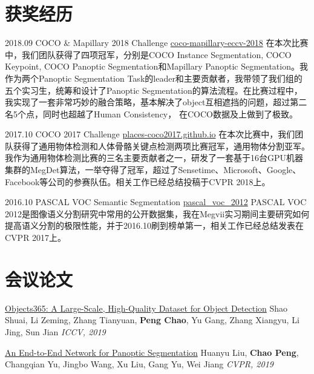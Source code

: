 \documentclass[]{friggeri-cv}
\begin{document}
\section{获奖经历}
  \begin{entrylist}
  \entry
    {2018.09}
    {COCO \& Mapillary 2018 Challenge}
    {\href{http://cocodataset.org/workshop/coco-mapillary-eccv-2018.html}{coco-mapillary-eccv-2018}}
    {在本次比赛中，我们团队获得了四项冠军，分别是COCO Instance Segmentation, COCO Keypoint, COCO Panoptic Segmentation和Mapillary Panoptic Segmentation。我作为两个Panoptic Segmentation Task的leader和主要贡献者，我带领了我们组的五个实习生，统筹和设计了Panoptic Segmentation的算法流程。在比赛过程中，我实现了一套非常巧妙的融合策略，基本解决了object互相遮挡的问题，超过第二名5个点，同时也超越了Human Consistency，
    在COCO数据及上做到了极致。}

  \entry
    {2017.10}
    {COCO 2017 Challenge}
    {\href{https://places-coco2017.github.io/}{places-coco2017.github.io}}
    {在本次比赛中，我们团队获得了通用物体检测和人体骨骼关键点检测两项比赛冠军，通用物体分割亚军。我作为通用物体检测比赛的三名主要贡献者之一，研发了一套基于16台GPU机器集群的MegDet算法，一举夺得了冠军，超过了Sensetime、Microsoft、Google、Facebook等公司的参赛队伍。相关工作已经总结投稿于CVPR 2018上。}

  \entry
    {2016.10}
    {PASCAL VOC Semantic Segmentation}
    {\href{http://host.robots.ox.ac.uk:8080/leaderboard/displaylb.php?challengeid=11&compid=6}{pascal\_voc\_2012}}
    {PASCAL VOC 2012是图像语义分割研究中常用的公开数据集，我在Megvii实习期间主要研究如何提高语义分割的极限性能，并于2016.10刷到榜单第一，相关工作已经总结发表在CVPR 2017上。}
  \end{entrylist}

\section{会议论文}
\href{http://openaccess.thecvf.com/content_ICCV_2019/papers/Shao_Objects365_A_Large-Scale_High-Quality_Dataset_for_Object_Detection_ICCV_2019_paper.pdf}{Objects365: A Large-Scale, High-Quality Dataset for Object Detection}\newline
Shao Shuai, Li Zeming, Zhang Tianyuan, \textbf{Peng Chao}, Yu Gang, Zhang Xiangyu, Li Jing, Sun Jian\newline
\emph{ICCV, 2019}

\href{https://arxiv.org/abs/1903.05027}{An End-to-End Network for Panoptic Segmentation}\newline
Huanyu Liu, \textbf{Chao Peng}, Changqian Yu, Jingbo Wang, Xu Liu, Gang Yu, Wei Jiang\newline
\emph{CVPR, 2019}
\end{document}
